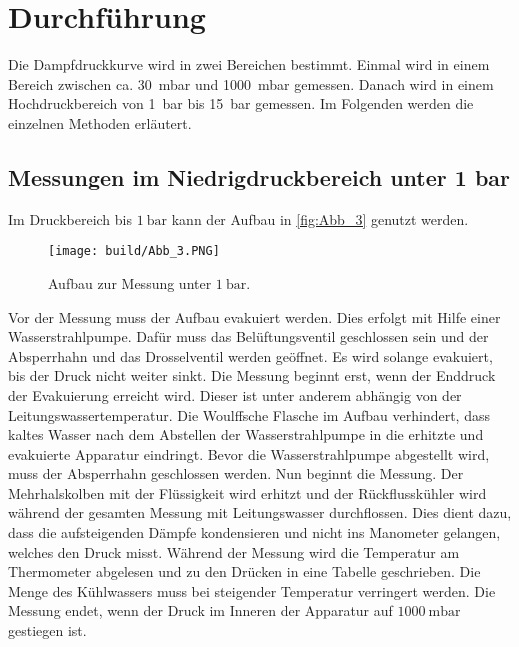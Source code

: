 \section{Durchführung}
\label{sec:Durchführung}

Die Dampfdruckkurve wird in zwei Bereichen bestimmt.
Einmal wird in einem Bereich zwischen ca. \qty{30}{\milli\bar} und \qty{1000}{\milli\bar} gemessen.
Danach wird in einem Hochdruckbereich von \qty{1}{\bar} bis \qty{15}{\bar} gemessen.
Im Folgenden werden die einzelnen Methoden erläutert.

\subsection{Messungen im Niedrigdruckbereich unter 1 bar} %
\label{sub:M_Niedrigdruckbereich}
Im Druckbereich bis $\qty{1}{\bar}$ kann der Aufbau in \autoref{fig:Abb_3} genutzt werden.
\begin{figure}[H]
    \centering
    \texttt{[image: build/Abb\_3.PNG]}
    \caption {Aufbau zur Messung unter $\qty{1}{\bar}$.\cite{V203}}
    \label{fig:Abb_3}
\end{figure}
Vor der Messung muss der Aufbau evakuiert werden.
Dies erfolgt mit Hilfe einer Wasserstrahlpumpe. Dafür muss das Belüftungsventil geschlossen sein und der Absperrhahn und das Drosselventil werden geöffnet.
Es wird solange evakuiert, bis der Druck nicht weiter sinkt. 
Die Messung beginnt erst, wenn der Enddruck der Evakuierung erreicht wird.
Dieser ist unter anderem abhängig von der Leitungswassertemperatur.
Die Woulffsche Flasche im Aufbau verhindert, dass kaltes Wasser nach dem Abstellen der Wasserstrahlpumpe in die erhitzte und evakuierte Apparatur eindringt.
Bevor die Wasserstrahlpumpe abgestellt wird, muss der Absperrhahn geschlossen werden.
Nun beginnt die Messung.
Der Mehrhalskolben mit der Flüssigkeit wird erhitzt und der Rückflusskühler wird während der gesamten Messung mit Leitungswasser durchflossen.
Dies dient dazu, dass die aufsteigenden Dämpfe kondensieren und nicht ins Manometer gelangen, welches den Druck misst.
Während der Messung wird die Temperatur am Thermometer abgelesen und zu den Drücken in eine Tabelle geschrieben.
Die Menge des Kühlwassers muss bei steigender Temperatur verringert werden.
Die Messung endet, wenn der Druck im Inneren der Apparatur auf $\qty{1000}{\milli\bar}$ gestiegen ist.

